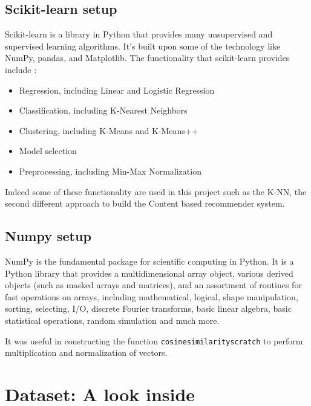 \documentclass[12pt,english]{report}
\begin{document}
\section{Scikit-learn setup}
Scikit-learn is a library in Python that provides many unsupervised and supervised learning algorithms. It’s built upon some of the technology like NumPy, pandas, and Matplotlib. 
The functionality that scikit-learn provides include \cite{scikit}:
\begin{itemize}
\item Regression, including Linear and Logistic Regression
\item Classification, including K-Nearest Neighbors
\item Clustering, including K-Means and K-Means++
\item Model selection
\item Preprocessing, including Min-Max Normalization
\end{itemize}
Indeed some of these functionality are used in this project such as the K-NN, the second different approach to build the Content based recommender system.
\section{Numpy setup}
NumPy is the fundamental package for scientific computing in Python. It is a Python library that provides a multidimensional array object, various derived objects (such as masked arrays and matrices), and an assortment of routines for fast operations on arrays, including mathematical, logical, shape manipulation, sorting, selecting, I/O, discrete Fourier transforms, basic linear algebra, basic statistical operations, random simulation and much more. \cite{numpy}\par
It was useful in constructing the function \texttt{cosine\textunderscore similarity\textunderscore scratch} to perform multiplication and normalization of vectors.
\chapter{Dataset: A look inside}\label{ch:dataset}
\end{document}
